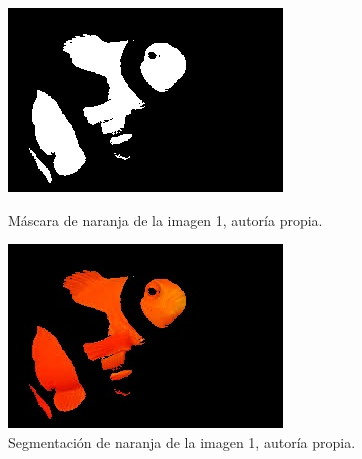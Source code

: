 \documentclass[a4paper,12pt]{article}
\begin{document}
{\vspace{0.5cm}

\begin{figure}[H]
  \centering
  \begin{minipage}[t]{0.45\textwidth}
      \centering
      \includegraphics[width=\textwidth]{processed_data/orange_mask_0.jpg} 
      \caption{Máscara de naranja de la imagen 1, autoría propia.}
      \label{fig:white_mask}
  \end{minipage}
  \hfill
  \begin{minipage}[t]{0.45\textwidth}
      \centering
      \includegraphics[width=\textwidth]{processed_data/orange_segmented_0.jpg}
      \caption{Segmentación de naranja de la imagen 1, autoría propia.}
      \label{fig:white_segmented}
  \end{minipage}
  
  \vspace{1cm} 


\end{figure}}
\end{document}
